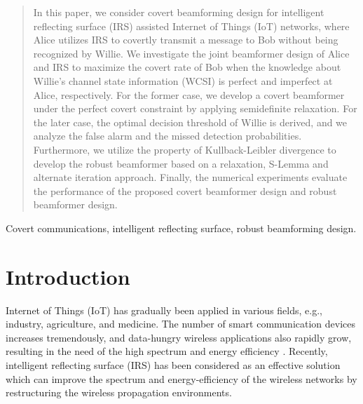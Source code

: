 \documentclass[10pt,journal,letterpaper,twocolumn,twoside]{IEEEtran} %
\begin{document}
\begin{abstract}
 In this paper, we consider
 covert   beamforming design  for
  intelligent reflecting surface (IRS)  assisted Internet of Things (IoT) networks, where  Alice  utilizes IRS to covertly transmit
  a message to Bob    without
being recognized by  Willie.
We investigate the joint beamformer design of Alice and IRS to maximize the covert rate of Bob when the knowledge about Willie's channel state information (WCSI) is perfect  and imperfect at Alice, respectively. For the former case, we develop a  covert beamformer  under the perfect covert constraint by applying semidefinite relaxation.
For  the later case,  the optimal   decision    threshold of  Willie is derived, and we analyze the false alarm and the missed detection probabilities.
Furthermore, we utilize the property of  Kullback-Leibler divergence to develop
the robust beamformer  based on a relaxation, S-Lemma and alternate iteration  approach.
Finally,   the numerical experiments evaluate the performance of the proposed covert beamformer design and robust beamformer design.








\end{abstract}
\begin{IEEEkeywords}
  Covert communications, intelligent reflecting surface,  robust beamforming design.
\end{IEEEkeywords}

\IEEEpeerreviewmaketitle

\section{Introduction}



Internet of Things (IoT) has gradually been applied in various fields, e.g., industry, agriculture, and medicine.
 The number of smart communication devices increases tremendously, and data-hungry wireless applications also rapidly grow, resulting in the need of the high spectrum and energy efficiency \cite{Gong20Toward, Guo2020Energy}.
 Recently, intelligent reflecting surface (IRS) has  been considered as an effective solution which can improve the spectrum and energy-efficiency of the wireless networks by restructuring the wireless propagation environments.
\end{document}
